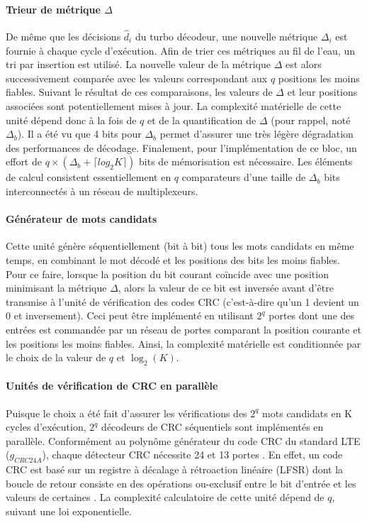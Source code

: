 \paragraph*{Trieur de métrique $\Delta$} De même que les décisions $\hat{d}_i$ du turbo décodeur, une nouvelle métrique $\Delta_i$ 
est fournie à chaque cycle d'exécution. Afin de trier ces métriques au
fil de l'eau, un tri par insertion est utilisé. La nouvelle valeur de la métrique $\Delta$ est alors successivement 
comparée avec les valeurs correspondant aux $q$ positions les moins fiables. Suivant le résultat de ces comparaisons, 
les valeurs de $\Delta$ et leur positions associées sont potentiellement mises à jour. La complexité matérielle de cette unité dépend donc 
à la fois de $q$ et de la quantification de $\Delta$ (pour rappel, noté $\Delta_b$). Il a été vu que 4 bits 
pour $\Delta_b$ permet d'assurer une très légère dégradation des performances de décodage. Finalement, pour 
l'implémentation de ce bloc, un effort de 
$q\times(\Delta_b + \lceil log_2{K} \rceil)$ bits de mémorisation est nécessaire. Les éléments de calcul consistent 
essentiellement en $q$ comparateurs d'une taille de $\Delta_b$ bits interconnectés à un réseau de multiplexeurs.

\paragraph*{Générateur de mots candidats} Cette unité génère séquentiellement (bit à bit) tous les mots candidats en 
même temps, en combinant le mot décodé et les positions des bits les moins fiables. Pour ce faire, lorsque la position 
du bit courant coïncide avec une position minimisant la métrique $\Delta$, alors la valeur de ce bit est inversée avant d'être
transmise à l'unité de vérification des codes CRC (c'est-à-dire qu'un 1 devient un 0 et inversement). Ceci peut être 
implémenté en utilisant $2^q$ portes  dont 
une des entrées est commandée par un réseau de portes  comparant la position courante et les positions les moins 
fiables. Ainsi, la complexité matérielle est conditionnée par le choix de la valeur de $q$ et $\log_2(K)$.

\paragraph*{Unités de vérification de CRC en parallèle} Puisque le choix a été fait d'assurer les vérifications 
des $2^q$ mots candidats en K cycles d'exécution, $2^q$ décodeurs de CRC séquentiels sont implémentés en parallèle.
Conformément au polynôme générateur du code CRC du standard LTE ($g_{CRC24A}$), chaque détecteur CRC nécessite 24 
 et 13 portes . En effet, un code CRC est basé sur un registre à décalage à rétroaction 
linéaire (LFSR) dont la boucle de retour consiste en des opérations ou-exclusif entre le bit d'entrée et les valeurs de
certaines  
. La complexité calculatoire de cette unité dépend de $q$, suivant une loi 
exponentielle.

